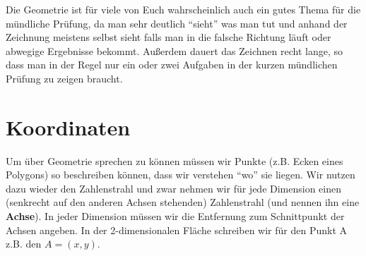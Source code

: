 \documentclass[a4paper]{book}%
\theoremstyle{definition}
\begin{document}
Die Geometrie ist für viele von Euch wahrscheinlich auch ein gutes Thema für die mündliche Prüfung, da man sehr deutlich \enquote{sieht} was man tut und anhand der Zeichnung meistens selbst sieht falls man in die falsche Richtung läuft oder abwegige Ergebnisse bekommt. Außerdem dauert das Zeichnen recht lange, so dass man in der Regel nur ein oder zwei Aufgaben in der kurzen mündlichen Prüfung zu zeigen braucht.



\section{Koordinaten}\label{Koordinaten}

Um über Geometrie sprechen zu können müssen wir Punkte (z.B. Ecken eines Polygons) so beschreiben können, dass wir verstehen \enquote{wo} sie liegen. Wir nutzen dazu wieder den Zahlenstrahl und zwar nehmen wir für jede Dimension einen (senkrecht auf den anderen Achsen stehenden) Zahlenstrahl (und nennen ihn eine \textbf{Achse}). In jeder Dimension müssen wir die Entfernung zum Schnittpunkt der Achsen angeben. In der 2-dimensionalen Fläche schreiben wir für den Punkt A z.B. den  $A=(x,y)$.
\end{document}
